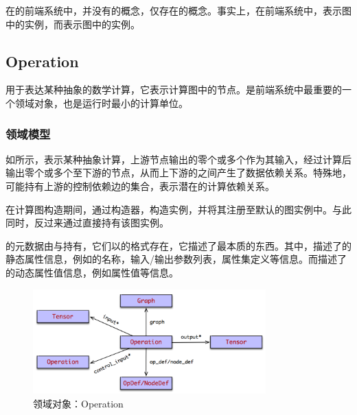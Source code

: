 \begin{content}

在的前端系统中，并没有的概念，仅存在的概念。事实上，在前端系统中，表示图中的实例，而表示图中的实例。

\subsection{Operation}

用于表达某种抽象的数学计算，它表示计算图中的节点。是前端系统中最重要的一个领域对象，也是\tf{}运行时最小的计算单位。

\subsubsection{领域模型}

如所示，表示某种抽象计算，上游节点输出的零个或多个作为其输入，经过计算后输出零个或多个至下游的节点，从而上下游的之间产生了数据依赖关系。特殊地，可能持有上游的控制依赖边的集合，表示潜在的计算依赖关系。

在计算图构造期间，通过构造器，构造实例，并将其注册至默认的图实例中。与此同时，反过来通过直接持有该图实例。

的元数据由与持有，它们以的格式存在，它描述了最本质的东西。其中，描述了的静态属性信息，例如的名称，输入/输出参数列表，属性集定义等信息。而描述了的动态属性值信息，例如属性值等信息。

\begin{figure}[H]
\centering
\includegraphics[width=0.8\textwidth]{figures/py-operation.png}
\caption{领域对象：Operation}
 \label{fig:py-operation}
\end{figure}


\end{content}
